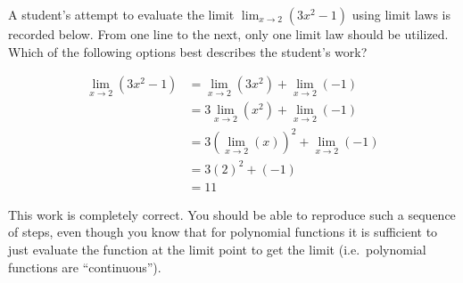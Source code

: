 \documentclass{ximera}
\author{Steven Gubkin}
\begin{document}
\begin{exercise}

	A student's attempt to evaluate the limit $\lim_{x \to 2} \left( 3x^2-1 \right)$ using limit laws is recorded below.  From one line to the next, only one limit law should be utilized.  Which of the following options best describes the student's work?
	
	\begin{align*}
		\lim_{x \to 2} \left( 3x^2-1 \right) &= \lim_{x \to 2} \left( 3x^2\right) + \lim_{x \to 2} \left( -1 \right)\\
		&= 3 \lim_{x \to 2} \left( x^2\right) + \lim_{x \to 2} \left( -1 \right)\\
		&= 3 \left( \lim_{x \to 2} \left( x\right) \right)^2 + \lim_{x \to 2} \left( -1 \right)\\
		&=3 \left( 2 \right)^2 + \left( -1 \right)\\
		&= 11
	\end{align*}
	
	\begin{multipleChoice}
	\end{multipleChoice}
	
	\begin{feedback}
	  This work is completely correct.  You should be able to
          reproduce such a sequence of steps, even though you know
          that for polynomial functions it is sufficient to just
          evaluate the function at the limit point to get the limit
          (i.e.\ polynomial functions are ``continuous'').
	\end{feedback}
	
\end{exercise}
\end{document}
